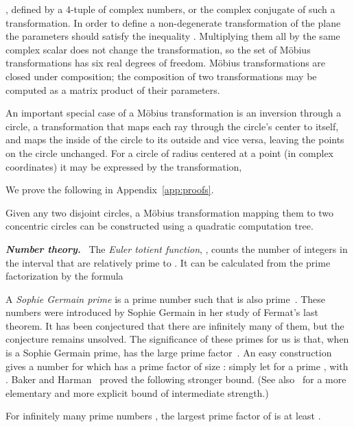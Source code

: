 \documentclass[oribibl,10pt]{llncs}
\newcommand{\Emph}[1]{\smallskip\textbf{\textit{#1}}~}
\begin{document}
\else
,
\fi
defined by a 4-tuple  of complex numbers, or the complex conjugate of such a transformation.
\ifFull
In order to define a non-degenerate transformation of the plane the parameters should satisfy the inequality . Multiplying them all by the same complex scalar does not change the transformation, so the set of M\"obius transformations has six real degrees of freedom. 
M\"obius transformations are closed under composition; the composition of two transformations may be computed as a  matrix product of their parameters.

An important special case of a M\"obius transformation is an inversion through a circle, a transformation that maps each ray through the circle's center to itself, and maps the inside of the circle to its outside and vice versa, leaving the points on the circle unchanged.
For a circle of radius  centered at a point  (in complex coordinates)
it may be expressed by the transformation,

\fi
We prove the following in Appendix~\ref{app:proofs}.

\begin{lemma}\label{lem:mob-trans}
Given any two disjoint circles, a M\"{o}bius transformation mapping them to two concentric circles can be constructed using a quadratic computation tree.
\end{lemma}

\Emph{Number theory.}
The \emph{Euler totient function}, , counts the number of integers in the interval  that are relatively prime to . It can be calculated from the prime factorization  by the formula 

A \emph{Sophie Germain prime} is a prime number  such that  
is also prime~\cite{Sho-CINTA-09}. 
\ifFull
These numbers were introduced by Sophie Germain in her study of Fermat's last theorem.
\fi
It has been conjectured that there are infinitely many of them, but the conjecture remains unsolved.
The significance of these primes for us is that, when  is a Sophie Germain prime,  has the large prime factor~. 
An easy construction gives a number 
for which  has a prime factor of size : simply let  for a prime , with . 
Baker and Harman~\cite{BakHar-AA-98} proved the following stronger bound.
\ifFull 
(See also~\cite{Har-MC-05} for a more elementary and more explicit bound of intermediate strength.)
\fi

\begin{lemma}
\label{lem:large-prime-factor-of-phi}
For infinitely many prime numbers , the largest prime factor of   is at least .
\end{lemma}
\end{document}
